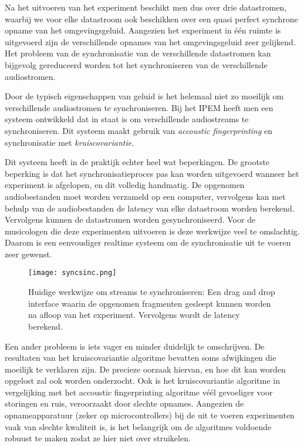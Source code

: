 Na het uitvoeren van het experiment beschikt men dus over drie datastromen, waarbij we voor elke datastroom ook beschikken over een quasi perfect synchrone opname van het omgevingsgeluid. Aangezien het experiment in één ruimte is uitgevoerd zijn de verschillende opnames van het omgevingsgeluid zeer gelijkend. Het probleem van de synchronisatie van de verschillende datastromen kan bijgevolg gereduceerd worden tot het synchroniseren van de verschillende audiostromen.

Door de typisch eigenschappen van geluid is het helemaal niet zo moeilijk om verschillende audiostromen te synchroniseren. Bij het IPEM heeft men een systeem ontwikkeld dat in staat is om verschillende audiostreams te synchroniseren. Dit systeem maakt gebruik van \textit{accoustic fingerprinting} en synchronisatie met \textit{kruiscovariantie}.

Dit systeem heeft in de praktijk echter heel wat beperkingen. De grootste beperking is dat het synchronisatieproces pas kan worden uitgevoerd wanneer het experiment is afgelopen, en dit volledig handmatig. De opgenomen audiobestanden moet worden verzameld op een computer, vervolgens kan met behulp van de audiobestanden de latency van elke datastroom worden berekend. Vervolgens kunnen de datastromen worden gesynchroniseerd. Voor de musicologen die deze experimenten uitvoeren is deze werkwijze veel te omslachtig. Daarom is een eenvoudiger realtime systeem om de synchronisatie uit te voeren zeer gewenst.

\begin{figure}[!h]
	\captionsetup{width=0.7\textwidth}
	\centering
	\texttt{[image: syncsinc.png]}
	\caption{Huidige werkwijze om streams te synchroniseren: Een drag and drop interface waarin de opgenomen fragmenten gesleept kunnen worden na afloop van het experiment. Vervolgens wordt de latency berekend.}
\end{figure}


Een ander probleem is iets vager en minder duidelijk te omschrijven. De resultaten van het kruiscovariantie algoritme bevatten soms afwijkingen die moeilijk te verklaren zijn. De precieze oorzaak hiervan, en hoe dit kan worden opgelost zal ook worden onderzocht. Ook is het kruiscovariantie algoritme in vergelijking met het accoustic fingerprinting algoritme véél gevoeliger voor storingen en ruis, veroorzaakt door slechte opnames. Aangezien de opnameapparatuur (zeker op microcontrollers) bij de uit te voeren experimenten vaak van slechte kwaliteit is, is het belangrijk om de algoritmes voldoende robuust te maken zodat ze hier niet over struikelen.\\

